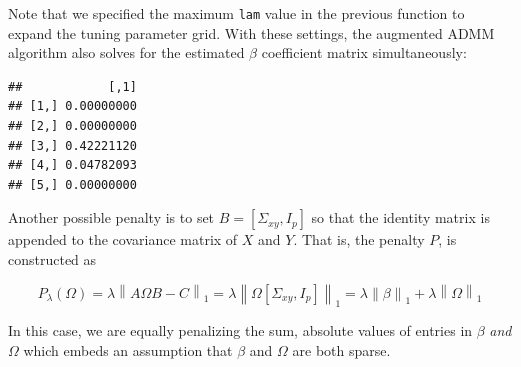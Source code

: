 \documentclass[11pt,]{report}
\newenvironment{Shaded}{\begin{snugshade}}{\end{snugshade}}
\newcommand{\CommentTok}[1]{\textcolor[rgb]{0.56,0.35,0.01}{\textit{#1}}}
\newcommand{\DataTypeTok}[1]{\textcolor[rgb]{0.13,0.29,0.53}{#1}}
\newcommand{\DecValTok}[1]{\textcolor[rgb]{0.00,0.00,0.81}{#1}}
\newcommand{\FloatTok}[1]{\textcolor[rgb]{0.00,0.00,0.81}{#1}}
\newcommand{\KeywordTok}[1]{\textcolor[rgb]{0.13,0.29,0.53}{\textbf{#1}}}
\newcommand{\NormalTok}[1]{#1}
\newcommand{\OperatorTok}[1]{\textcolor[rgb]{0.81,0.36,0.00}{\textbf{#1}}}
\theoremstyle{definition}
\theoremstyle{definition}
\theoremstyle{definition}
\theoremstyle{remark}
\begin{document}
Note that we specified the maximum \texttt{lam} value in the previous function to expand the tuning parameter grid. With these settings, the augmented ADMM algorithm also solves for the estimated \(\beta\) coefficient matrix simultaneously:

\vspace{0.5cm}

\begin{Shaded}
\end{Shaded}

\begin{verbatim}
##            [,1]
## [1,] 0.00000000
## [2,] 0.00000000
## [3,] 0.42221120
## [4,] 0.04782093
## [5,] 0.00000000
\end{verbatim}

\vspace{0.5cm}

Another possible penalty is to set \(B = \left[ \Sigma_{xy}, I_{p} \right]\) so that the identity matrix is appended to the covariance matrix of \(X\) and \(Y\). That is, the penalty \(P\), is constructed as

\[ P_{\lambda}\left(\Omega \right) = \lambda\left\| A\Omega B - C \right\|_{1} = \lambda\left\| \Omega\left[\Sigma_{xy}, I_{p}\right] \right\|_{1} = \lambda\left\| \beta \right\|_{1} + \lambda\left\| \Omega \right\|_{1} \]

In this case, we are equally penalizing the sum, absolute values of entries in \(\beta\) \emph{and} \(\Omega\) which embeds an assumption that \(\beta\) and \(\Omega\) are both sparse.

\vspace{0.5cm}

\begin{Shaded}
\end{Shaded}
\end{document}
